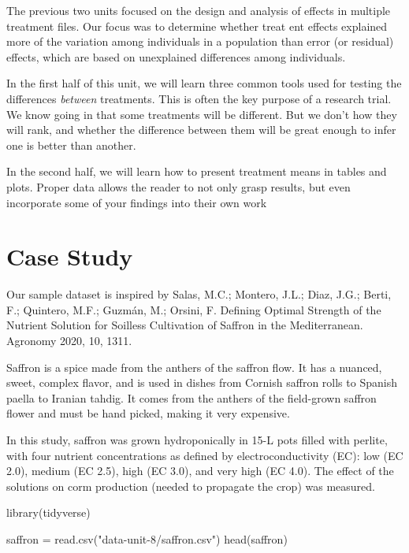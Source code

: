\documentclass[
]{book}
\newenvironment{Shaded}{\begin{snugshade}}{\end{snugshade}}
\newcommand{\FunctionTok}[1]{\textcolor[rgb]{0.00,0.00,0.00}{#1}}
\newcommand{\NormalTok}[1]{#1}
\newcommand{\OtherTok}[1]{\textcolor[rgb]{0.56,0.35,0.01}{#1}}
\newcommand{\StringTok}[1]{\textcolor[rgb]{0.31,0.60,0.02}{#1}}
\begin{document}
The previous two units focused on the design and analysis of effects in multiple treatment files. Our focus was to determine whether treat ent effects explained more of the variation among individuals in a population than error (or residual) effects, which are based on unexplained differences among individuals.

In the first half of this unit, we will learn three common tools used for testing the differences \emph{between} treatments. This is often the key purpose of a research trial. We know going in that some treatments will be different. But we don't how they will rank, and whether the difference between them will be great enough to infer one is better than another.

In the second half, we will learn how to present treatment means in tables and plots. Proper data allows the reader to not only grasp results, but even incorporate some of your findings into their own work

\hypertarget{case-study-4}{%
\section{Case Study}\label{case-study-4}}

Our sample dataset is inspired by Salas, M.C.; Montero, J.L.; Diaz, J.G.; Berti, F.; Quintero, M.F.; Guzmán, M.; Orsini, F. Defining Optimal Strength of the Nutrient Solution for Soilless Cultivation of Saffron in the Mediterranean. Agronomy 2020, 10, 1311.

Saffron is a spice made from the anthers of the saffron flow. It has a nuanced, sweet, complex flavor, and is used in dishes from Cornish saffron rolls to Spanish paella to Iranian tahdig. It comes from the anthers of the field-grown saffron flower and must be hand picked, making it very expensive.

In this study, saffron was grown hydroponically in 15-L pots filled with perlite, with four nutrient concentrations as defined by electroconductivity (EC): low (EC 2.0), medium (EC 2.5), high (EC 3.0), and very high (EC 4.0). The effect of the solutions on corm production (needed to propagate the crop) was measured.

\begin{Shaded}
\begin{Highlighting}[]
\FunctionTok{library}\NormalTok{(tidyverse)}

\NormalTok{saffron }\OtherTok{=} \FunctionTok{read.csv}\NormalTok{(}\StringTok{"data{-}unit{-}8/saffron.csv"}\NormalTok{)}
\FunctionTok{head}\NormalTok{(saffron)}
\end{Highlighting}
\end{Shaded}
\end{document}
